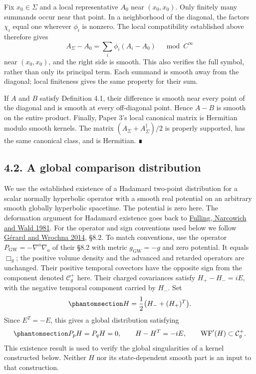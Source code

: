 \documentclass[
  english,
  11pt,
  reqno]{amsart}
\begin{document}
Fix \(x_0\in\Sigma\) and a local representative \(A_0\) near
\((x_0,x_0)\). Only finitely many summands occur near that point. In a
neighborhood of the diagonal, the factors \(\chi_i\) equal one wherever
\(\phi_i\) is nonzero. The local compatibility established above
therefore gives \[
A_\Sigma-A_0
=\sum_i\phi_i(A_i-A_0)
\quad\bmod C^\infty
\] near \((x_0,x_0)\), and the right side is smooth. This also verifies
the full symbol, rather than only its principal term. Each summand is
smooth away from the diagonal; local finiteness gives the same property
for their sum.

If \(A\) and \(B\) satisfy Definition 4.1, their difference is smooth
near every point of the diagonal and is smooth at every off-diagonal
point. Hence \(A-B\) is smooth on the entire product. Finally, Paper 3's
local canonical matrix is Hermitian modulo smooth kernels. The matrix
\((A_\Sigma+A_\Sigma^\dagger)/2\) is properly supported, has the same
canonical class, and is Hermitian. ∎

\protect{}\label{sec:p4-global-hadamard-witness}

\subsection{4.2. A global comparison
distribution}\label{a-global-comparison-distribution}

We use the established existence of a Hadamard two-point distribution
for a scalar normally hyperbolic operator with a smooth real potential
on an arbitrary smooth globally hyperbolic spacetime. The potential is
zero here. The deformation argument for Hadamard existence goes back to
\hyperref[ref-FullingNarcowichWald1981]{Fulling, Narcowich and Wald
1981}. For the operator and sign conventions used below we follow
\hyperref[ref-GerardWrochna2014]{Gérard and Wrochna 2014}, §8.2. To
match conventions, use the operator
\(P_{\mathrm{GW}}=-\nabla^a\nabla_a\) of their §8.2 with metric
\(g_{\mathrm{GW}}=-g\) and zero potential. It equals \(\Box_g\); the
positive volume density and the advanced and retarded operators are
unchanged. Their positive temporal covectors have the opposite sign from
the component denoted \(\mathcal C_g^+\) here. Their charged covariances
satisfy \(H_+-H_-=iE\), with the negative temporal component carried by
\(H_-\). Set
\begin{equation}\protect\phantomsection\label{eq:p4-witness-sign-conversion}{
H=\frac12\bigl(H_-+(H_+)^T\bigr).
}\end{equation} Since \(E^T=-E\), this gives a global distribution
satisfying
\begin{equation}\protect\phantomsection\label{eq:p4-global-hadamard-witness}{
P_pH=P_qH=0,
\qquad
H-H^T=-iE,
\qquad
\operatorname{WF}'(H)\subset\mathcal C_g^+.
}\end{equation} This existence result is used to verify the global
singularities of a kernel constructed below. Neither \(H\) nor its
state-dependent smooth part is an input to that construction.
\end{document}
